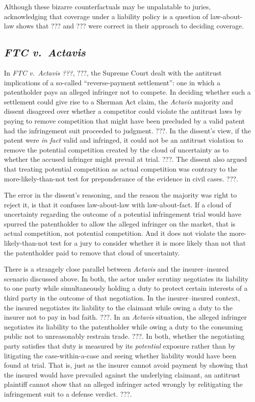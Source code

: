 \documentclass[
  12pt,
  letterpaper,
]{scrartcl}
\begin{document}
Although these bizarre counterfactuals may be unpalatable to juries,
acknowledging that coverage under a liability policy is a question of
law-about-law shows that ??? and ??? were correct in their approach to deciding
coverage.


\subsection{\textit{FTC v.~Actavis}}

In \textit{FTC v.~Actavis ???}, ???, the Supreme Court dealt with the antitrust
implications of a so-called ``reverse-payment settlement'': one in which a
patentholder pays an alleged infringer not to compete. In deciding whether such
a settlement could give rise to a Sherman Act claim, the \textit{Actavis}
majority and dissent disagreed over whether a competitor could violate the
antitrust laws by paying to remove competition that might have been precluded
by a valid patent had the infringement suit proceeded to judgment. ???. In the
dissent's view, if the patent were \emph{in fact} valid and infringed, it could
not be an antitrust violation to remove the potential competition created by
the cloud of uncertainty as to whether the accused infringer might prevail at
trial. ???. The dissent also argued that treating potential competition as
actual competition was contrary to the more-likely-than-not test for
preponderance of the evidence in civil cases. ???.

The error in the dissent's reasoning, and the reason the majority was right to
reject it, is that it confuses law-about-law with law-about-fact. If a cloud of
uncertainty regarding the outcome of a potential infringement trial would have
spurred the patentholder to allow the alleged infringer on the market, that is
actual competition, not potential competition. And it does not violate the
more-likely-than-not test for a jury to consider whether it is more likely than
not that the patentholder paid to remove that cloud of uncertainty.

There is a strangely close parallel between \textit{Actavis} and the
insurer--insured scenario discussed above. In both, the actor under scrutiny
negotiates its liability to one party while simultaneously holding a duty to
protect certain interests of a third party in the outcome of that negotiation.
In the insurer--insured context, the insured negotiates its liability to the
claimant while owing a duty to the insurer not to pay in bad faith. ???. In an
\emph{Actavis} situation, the alleged infringer negotiates its liability to the
patentholder while owing a duty to the consuming public not to unreasonably
restrain trade. ???. In both, whether the negotiating party satisfies that duty
is measured by its \emph{potential} exposure rather than by litigating the
case-within-a-case and seeing whether liability would have been found at trial.
That is, just as the insurer cannot avoid payment by showing that the insured
would have prevailed against the underlying claimant, an antitrust plaintiff
cannot show that an alleged infringer acted wrongly by relitigating the
infringement suit to a defense verdict. ???.
\end{document}
